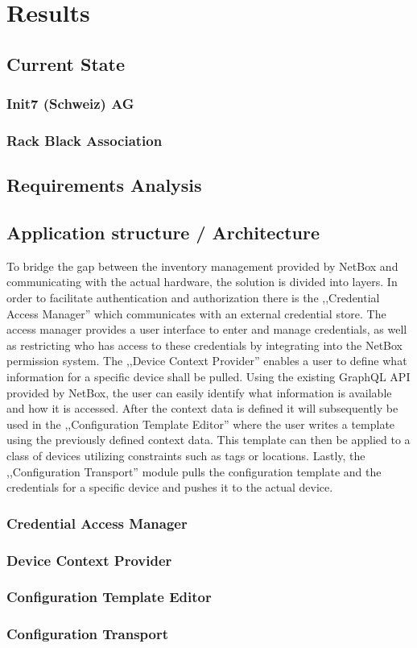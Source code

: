 \chapter{\label{results}Results}
\thispagestyle{fancy}

\section{Current State}

\subsection{Init7 (Schweiz) AG}

\subsection{Rack Black Association}

\section{Requirements Analysis}

\section{Application structure / Architecture}

To bridge the gap between the inventory management provided by NetBox and communicating with the actual hardware,
the solution is divided into layers.
In order to facilitate authentication and authorization there is the ,,Credential Access Manager'' which communicates
with an external credential store. The access manager provides a user interface to enter and manage credentials, as well
as restricting who has access to these credentials by integrating into the NetBox permission system.
The ,,Device Context Provider'' enables a user to define what information for a specific device shall be pulled.
Using the existing GraphQL API provided by NetBox, the user can easily identify what information is available and how it is
accessed. After the context data is defined it will subsequently be used in the ,,Configuration Template Editor''
where the user writes a template using the previously defined context data. This template can then be applied to
a class of devices utilizing constraints such as tags or locations.
Lastly, the ,,Configuration Transport'' module pulls the configuration template and the credentials for a specific device
and pushes it to the actual device.

\subsection{Credential Access Manager}

\subsection{Device Context Provider}

\subsection{Configuration Template Editor}

\subsection{Configuration Transport}